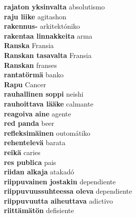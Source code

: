 \textbf{ rajaton yksinvalta  } absolutismo \\
\textbf{ raju liike  } agitashon \\
\textbf{ rakennus-  } arkitektóniko \\
\textbf{ rakentaa linnakkeita  } arma \\
\textbf{ Ranska  } Fransia \\
\textbf{ Ranskan tasavalta  } Fransia \\
\textbf{ Ranskan  } franses \\
\textbf{ rantatörmä  } banko \\
\textbf{ Rapu  } Cancer \\
\textbf{ rauhallinen soppi  } neishi \\
\textbf{ rauhoittava lääke  } calmante \\
\textbf{ reagoiva aine  } agente \\
\textbf{ red panda  } beer \\
\textbf{ refleksimäinen  } outomátiko \\
\textbf{ rehentelevä  } barata \\
\textbf{ reikä  } caries \\
\textbf{ res publica  } pais \\
\textbf{ riidan alkaja  } atakadó \\
\textbf{ riippuvainen jostakin  } dependiente \\
\textbf{ riippuvuussuhteessa oleva  } dependiente \\
\textbf{ riippuvuutta aiheuttava  } adictivo \\
\textbf{ riittämätön  } defisiente \\
